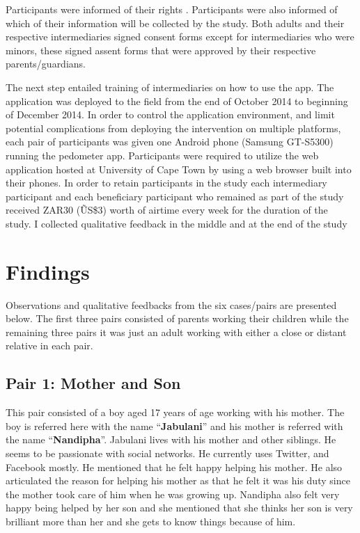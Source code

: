 Participants were informed of their rights . Participants were also informed of which of their information will be collected by the study. Both adults and their respective intermediaries signed consent forms except for intermediaries who were minors, these signed assent forms that were approved by their respective parents/guardians. 

The next step entailed training of intermediaries on how to use the app. The application was deployed to the field from the end of October 2014 to beginning of December 2014. In order to control the application environment, and limit potential complications from deploying the intervention on multiple platforms, each pair of participants was given one Android phone (Samsung GT-S5300) running the pedometer app. Participants were required to utilize the web application hosted at University of Cape Town by using a web browser built into their phones. In order to retain participants in the study each intermediary participant and each beneficiary participant who remained as part of the study received ZAR30 (\~US\$3) worth of airtime every week for the duration of the study. I collected qualitative feedback in the middle and at the end of the study
\section{Findings}
Observations and qualitative feedbacks from the six cases/pairs are presented below. The first three pairs consisted of parents working their children while the remaining three pairs it was just an adult working with either a close or distant relative in each pair.
\subsection*{\textbf{Pair 1: Mother and Son}}
This pair consisted of a boy aged 17 years of age working with his mother. The boy is referred here with the name ``\textbf{Jabulani}'' and his mother is referred with the name ``\textbf{Nandipha}''. Jabulani lives with his mother and other siblings. He seems to be passionate with social networks. He currently uses Twitter, and Facebook mostly. He mentioned that he felt happy helping his mother. He also articulated the reason for helping his mother as that he felt it was his duty since the mother took care of him when he was growing up. Nandipha also felt very happy being helped by her son and she mentioned that she thinks her son is very brilliant more than her and she gets to know things because of him. 

